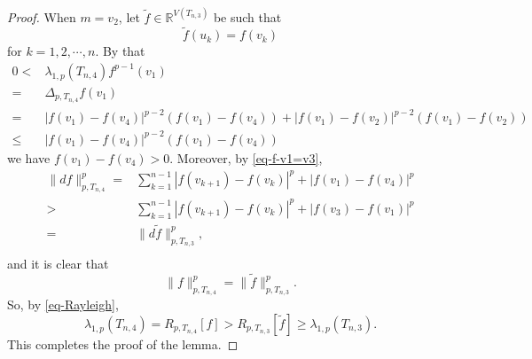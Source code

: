 \documentclass[10pt,a4paper]{amsart}
\def\R{\mathbb{R}}
\def\wt{\widetilde}
\begin{document}
\begin{proof}
When $m=v_2$, let $\wt f\in \R^{V(T_{n,3})}$ be such that
\begin{equation*}
\wt f(u_k)=f(v_k)
\end{equation*}
for $k=1,2,\cdots,n$. By that
\begin{equation*}
\begin{split}
0<&\lambda_{1,p}(T_{n,4})f^{p-1}(v_1)\\
=&\Delta_{p,T_{n,4}} f(v_1)\\
=&|f(v_1)-f(v_4)|^{p-2}(f(v_1)-f(v_4))+|f(v_1)-f(v_2)|^{p-2}(f(v_1)-f(v_2))\\
\leq& |f(v_1)-f(v_4)|^{p-2}(f(v_1)-f(v_4))
\end{split}
\end{equation*}
we have $f(v_1)-f(v_4)>0$. Moreover, by \eqref{eq-f-v1=v3}, 
\begin{equation*}
\begin{split}
\|df\|_{p,T_{n,4}}^p=&\sum_{k=1}^{n-1}|f(v_{k+1})-f(v_k)|^{p}+|f(v_1)-f(v_4)|^p\\
>&\sum_{k=1}^{n-1}|f(v_{k+1})-f(v_k)|^p+|f(v_3)-f(v_1)|^p\\
=&\|d\wt f\|_{p,T_{n,3}}^p,\\
\end{split}
\end{equation*}
and it is clear that
$$\|f\|_{p,T_{n,4}}^p=\|\wt f\|_{p,T_{n,3}}^p.$$
So, by \eqref{eq-Rayleigh},
$$\lambda_{1,p}(T_{n,4})=R_{p,T_{n,4}}[f]>R_{p,T_{n,3}}[\wt f]\geq \lambda_{1,p}(T_{n,3}).$$
This completes the proof of the lemma.
\end{proof}
\end{document}
